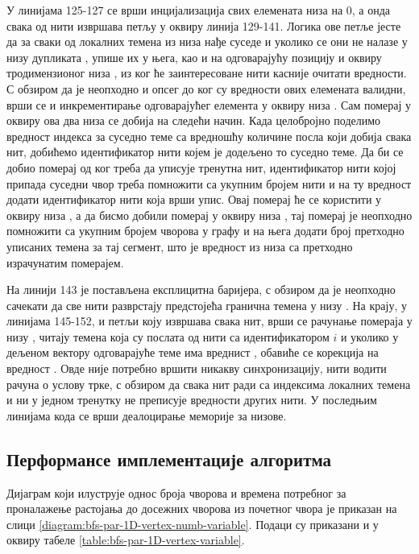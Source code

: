 \par
У линијама 125-127 се врши инцијализација свих елемената низа  на $0$, а онда свака од нити извршава петљу у оквиру линија 129-141. Логика ове петље јесте да за сваки од локалних темена из низа  нађе суседе и уколико се они не налазе у низу дупликата , упише их у њега, као и на одговарајућу позицију и оквиру тродимензионог низа , из ког ће заинтересоване нити касније очитати вредности. С обзиром да је неопходно и опсег до ког су вредности ових елемената валидни, врши се и инкрементирање одговарајућег елемента у оквиру низа . Сам померај у оквиру ова два низа се добија на следећи начин. Када целобројно поделимо вредност индекса за суседно теме са вредношћу количине посла који добија свака нит, добићемо идентификатор нити којем је додељено то суседно теме. Да би се добио померај од ког треба да уписује тренутна нит, идентификатор нити којој припада суседни чвор треба помножити са укупним бројем нити и на ту вредност додати идентификатор нити која врши упис. Овај померај ће се користити у оквиру низа , а да бисмо добили померај у оквиру низа , тај померај је неопходно помножити са укупним бројем чворова у графу и на њега додати број претходно уписаних темена за тај сегмент, што је вредност из низа  са претходно израчунатим померајем.

\par
На линији 143 је постављена експлицитна баријера, с обзиром да је неопходно сачекати да све нити разврстају предстојећа гранична темена у низу . На крају, у линијама 145-152, и  петљи коју извршава свака нит, врши се рачунање помераја у низу , читају темена која су послата од нити са идентификатором $i$ и уколико у дељеном вектору  одговарајуће теме има вреднист , обавиће се корекција на вредност . Овде није потребно вршити никакву синхронизацију, нити водити рачуна о услову трке, с обзиром да свака нит ради са индексима локалних темена и ни у једном тренутку не преписује вредности других нити. У последњим линијама кода се врши деалоцирање меморије за низове.

\subsection{Перформансе имплементације алгоритма}
Дијаграм који илуструје однос броја чворова и времена потребног за проналажење растојања до досежних чворова из почетног чвора је приказан на слици \ref{diagram:bfs-par-1D-vertex-numb-variable}. Подаци су приказани и у оквиру табеле \ref{table:bfs-par-1D-vertex-variable}.

